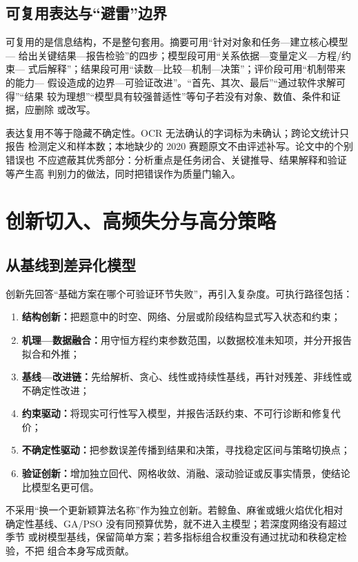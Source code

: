 \documentclass[UTF8,a4paper,12pt]{ctexart}
\begin{document}
\subsection{可复用表达与“避雷”边界}

可复用的是信息结构，不是整句套用。摘要可用“针对对象和任务—建立核心模型—
给出关键结果—报告检验”的四步；模型段可用“关系依据—变量定义—方程/约束—
式后解释”；结果段可用“读数—比较—机制—决策”；评价段可用“机制带来的能力—
假设造成的边界—可验证改进”。“首先、其次、最后”“通过软件求解可得”“结果
较为理想”“模型具有较强普适性”等句子若没有对象、数值、条件和证据，应删除
或改写。

表达复用不等于隐藏不确定性。OCR 无法确认的字词标为未确认；跨论文统计只报告
检测定义和样本数；本地缺少的 2020 赛题原文不由评述补写。论文中的个别错误也
不应遮蔽其优秀部分：分析重点是任务闭合、关键推导、结果解释和验证等产生高
判别力的做法，同时把错误作为质量门输入。

\section{创新切入、高频失分与高分策略}

\subsection{从基线到差异化模型}

创新先回答“基础方案在哪个可验证环节失败”，再引入复杂度。可执行路径包括：
\begin{enumerate}
  \item \textbf{结构创新：}把题意中的时空、网络、分层或阶段结构显式写入状态和约束；
  \item \textbf{机理—数据融合：}用守恒方程约束参数范围，以数据校准未知项，并分开报告拟合和外推；
  \item \textbf{基线—改进链：}先给解析、贪心、线性或持续性基线，再针对残差、非线性或不确定性改进；
  \item \textbf{约束驱动：}将现实可行性写入模型，并报告活跃约束、不可行诊断和修复代价；
  \item \textbf{不确定性驱动：}把参数误差传播到结果和决策，寻找稳定区间与策略切换点；
  \item \textbf{验证创新：}增加独立回代、网格收敛、消融、滚动验证或反事实情景，使结论比模型名更可信。
\end{enumerate}

不采用“换一个更新颖算法名称”作为独立创新。若鲸鱼、麻雀或蛾火焰优化相对
确定性基线、GA/PSO 没有同预算优势，就不进入主模型；若深度网络没有超过季节
或树模型基线，保留简单方案；若多指标组合权重没有通过扰动和秩稳定检验，不把
组合本身写成贡献。
\end{document}
